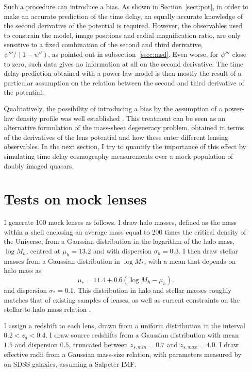 \documentclass[usenatbib]{mnras}
\def\psiii{\psi''}
\def\psiiii{\psi'''}
\def\Sref#1{Section~\ref{#1}\xspace}
\begin{document}
Such a procedure can introduce a bias. As shown in \Sref{sect:pot}, in order to make an accurate prediction of the time delay, an equally accurate knowledge of the second derivative of the potential is required. However, the observables used to constrain the model, image positions and radial magnification ratio, are only sensitive to a fixed combination of the second and third derivative, $\psiiii/(1-\psiii)$, as pointed out in subsection~\ref{ssec:msd}. 
Even worse, for $\psiiii$ close to zero, such data gives no information at all on the second derivative.
The time delay prediction obtained with a power-law model is then mostly the result of a particular assumption on the relation between the second and third derivative of the potential.

Qualitatively, the possibility of introducing a bias by the assumption of a power-law density profile was well established \citep{S+S13}.
This treatment can be seen as an alternative formulation of the mass-sheet degeneracy problem, obtained in terms of the derivatives of the lens potential and how these enter different lensing observables.
In the next section, I try to quantify the importance of this effect by simulating time delay cosmography measurements over a mock population of doubly imaged quasars.

\section{Tests on mock lenses}\label{sect:mock}

I generate 100 mock lenses as follows. I draw halo masses, defined as the mass within a shell enclosing an average mass equal to 200 times the critical density of the Universe, from a Gaussian distribution in the logarithm of the halo mass, $\log{M_h}$, centred at $\mu_h=13.2$ and with dispersion $\sigma_h=0.3$. I then draw stellar masses from a Gaussian distribution in $\log{M_*}$, with a mean that depends on halo mass as
\begin{equation}
\mu_* = 11.4 + 0.6(\log{M_h} - \mu_h),
\end{equation}
and dispersion $\sigma_*=0.1$.
This distribution in halo and stellar masses roughly matches that of existing samples of lenses, as well as current constraints on the stellar-to-halo mass relation \citep{Gav++07, Aug++10, Beh++13}.

I assign a redshift to each lens, drawn from a uniform distribution in the interval $0.2 < z_d < 0.4$. I draw source redshifts from a Gaussian distribution with mean $1.5$ and dispersion $0.5$, truncated between $z_{s,min}=0.7$ and $z_{s,max}=4.0$.
I draw effective radii from a Gaussian mass-size relation, with parameters measured by \citet{New++12} on SDSS galaxies, assuming a Salpeter IMF.
\end{document}
